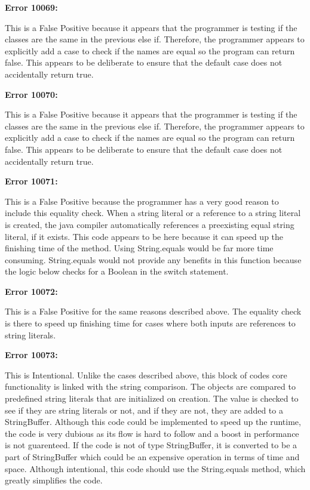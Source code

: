 \documentclass{article}
\begin{document}
\begin{enumerate}[(a)]
  \textbf{Error 10069:}

  This is a False Positive because it appears that the programmer is testing if the classes are the same in the previous else if. Therefore, the programmer appears to explicitly add a case to check if the names are equal so the program can return false. This appears to be deliberate to ensure that the default case does not accidentally return true.

  \textbf{Error 10070:}

  This is a False Positive because it appears that the programmer is testing if the classes are the same in the previous else if. Therefore, the programmer appears to explicitly add a case to check if the names are equal so the program can return false. This appears to be deliberate to ensure that the default case does not accidentally return true.

  \textbf{Error 10071:}

  This is a False Positive because the programmer has a very good reason to include this equality check. When a string literal or a reference to a string literal is created, the java compiler automatically references a preexisting equal string literal, if it exists. This code appears to be here because it can speed up the finishing time of the method. Using String.equals would be far more time consuming. String.equals would not provide any benefits in this function because the logic below checks for a Boolean in the switch statement.

  \textbf{Error 10072:}

  This is a False Positive for the same reasons described above. The equality check is there to speed up finishing time for cases where both inputs are references to string literals.
  
  \textbf{Error 10073:}

  This is Intentional. Unlike the cases described above, this block of codes core functionality is linked with the string comparison. The objects are compared to predefined string literals that are initialized on creation. The value is checked to see if they are string literals or not, and if they are not, they are added to a StringBuffer. Although this code could be implemented to speed up the runtime, the code is very dubious as its flow is hard to follow and a boost in performance is not guarenteed. If the code is not of type StringBuffer, it is converted to be a part of StringBuffer which could be an expensive operation in terms of time and space. Although intentional, this code should use the String.equals method, which greatly simplifies the code.


\end{enumerate}
\end{document}
